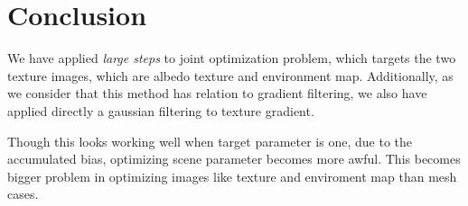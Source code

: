 \section*{Conclusion}\label{ch:ch5label}

We have applied \emph{large steps}\cite{Nicolet2021Large} to joint optimization problem, which targets the two texture images, which are albedo texture and environment map. Additionally, as we consider that this method has relation to gradient filtering, we also have applied directly a gaussian filtering to texture gradient.

Though this looks working well when target parameter is one, due to the accumulated bias, optimizing scene parameter becomes more awful. This becomes bigger problem in optimizing images like texture and enviroment map than mesh cases.